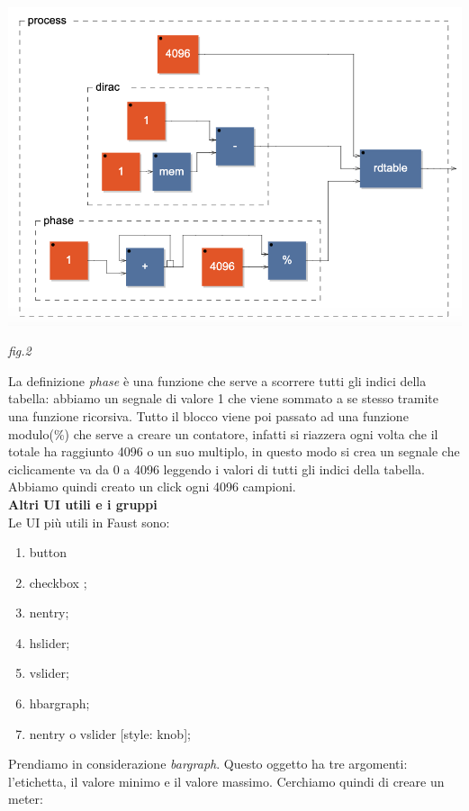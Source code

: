 \documentclass[11pt]{article}
\begin{document}
\begin{multicols*}{2}
\begin{center}
\includegraphics[scale=0.3]{img/05.png}

{\scriptsize \emph{fig.2 }}
\end{center}

La definizione \textit{phase} è una funzione che serve a scorrere tutti gli indici della tabella: abbiamo un segnale di valore 1 che viene sommato a se stesso tramite una funzione ricorsiva. Tutto il blocco viene poi passato ad una funzione modulo(\%) che serve a creare un contatore, infatti si riazzera ogni volta che il totale ha raggiunto 4096 o un suo multiplo, in questo modo si crea un segnale che ciclicamente va da 0 a 4096 leggendo i valori di tutti gli indici della tabella. Abbiamo quindi creato un click ogni 4096 campioni.\\

\textbf{Altri UI utili e i gruppi}\\

Le UI più utili in Faust sono:

\begin{enumerate}
\scriptsize
\item button
\item checkbox ; 
\item nentry;
\item hslider;
\item vslider;
\item hbargraph;
\item nentry o vslider [style: knob];
\end{enumerate}

Prendiamo in considerazione \textit{bargraph}. Questo oggetto ha tre argomenti: l'etichetta, il valore minimo e il valore massimo. Cerchiamo quindi di creare un meter:


\end{multicols*}
\end{document}
